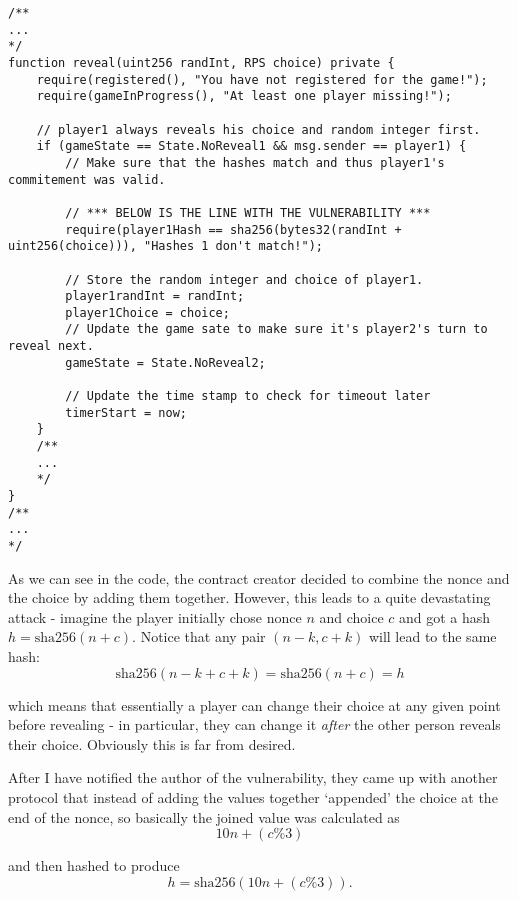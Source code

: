 \documentclass{article}
\begin{document}
    \begin{lstlisting}[language=Solidity]
/**
...
*/
function reveal(uint256 randInt, RPS choice) private {
    require(registered(), "You have not registered for the game!");
    require(gameInProgress(), "At least one player missing!");

    // player1 always reveals his choice and random integer first.
    if (gameState == State.NoReveal1 && msg.sender == player1) {
        // Make sure that the hashes match and thus player1's commitement was valid.

        // *** BELOW IS THE LINE WITH THE VULNERABILITY ***
        require(player1Hash == sha256(bytes32(randInt + uint256(choice))), "Hashes 1 don't match!");

        // Store the random integer and choice of player1.
        player1randInt = randInt;
        player1Choice = choice;
        // Update the game sate to make sure it's player2's turn to reveal next.
        gameState = State.NoReveal2;

        // Update the time stamp to check for timeout later
        timerStart = now;
    }
    /**
    ...
    */
}
/**
...
*/
    \end{lstlisting}

    \noindent As we can see in the code, the contract
    creator decided to combine the nonce and the choice by
    adding them together. However, this leads to a quite
    devastating attack - imagine the player initially chose
    nonce \(n\) and choice \(c\) and got a hash \(h =
    \text{sha256}(n + c)\). Notice that any pair
    \((n-k,c+k)\) will lead to the same hash:
    \[
       \text{sha256}(n-k+c+k) = \text{sha256}(n+c) = h 
    \]

    \noindent which means that essentially a player can
    change their choice at any given point before revealing
    - in particular, they can change it {\itshape after} the
    other person reveals their choice. Obviously this is far
    from desired.
    \newline

    \noindent After I have notified the author of the
    vulnerability, they came up with another protocol that
    instead of adding the values together `appended' the
    choice at the end of the nonce, so basically the joined
    value was calculated as
    \[
        10n + (c\%3)
    \]

    \noindent and then hashed to produce
    \[
        h = \text{sha256}(10n + (c\%3)).
    \]
\end{document}
